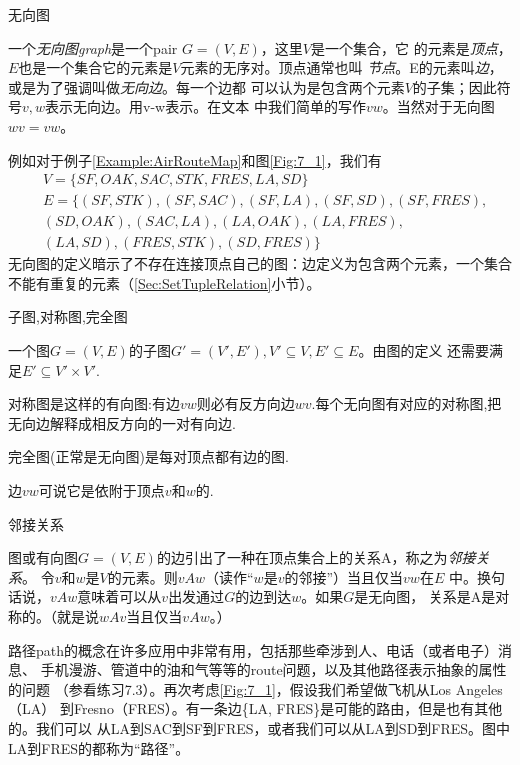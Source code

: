 \begin{definition}
无向图

一个\emph{无向图graph}是一个pair $G=(V,E)$，这里$V$是一个集合，它
的元素是\emph{顶点}，$E$也是一个集合它的元素是$V$元素的无序对。顶点通常也叫
\emph{节点}。E的元素叫\emph{边}，或是为了强调叫做\emph{无向边}。每一个边都
可以认为是包含两个元素$V$的子集；因此符号${v, w}$表示无向边。用v-w表示。在文本
中我们简单的写作$vw$。当然对于无向图$wv=vw$。
\end{definition}

例如对于例子\ref{Example:AirRouteMap}和图\ref{Fig:7_1}，我们有
\begin{displaymath}
\begin{aligned}
&V=\{SF,OAK, SAC, STK, FRES, LA, SD\}\\
&E=\{(SF,STK), (SF,SAC), (SF,LA),(SF,SD), (SF,FRES),\\
&(SD,OAK),(SAC,LA),(LA,OAK),(LA,FRES),\\
&(LA,SD),(FRES, STK), (SD, FRES)\}
\end{aligned}
\end{displaymath}
无向图的定义暗示了不存在连接顶点自己的图：边定义为包含两个元素，一个集合
不能有重复的元素（\ref{Sec:SetTupleRelation}小节）。

\begin{definition}
子图,对称图,完全图

一个图$G=(V,E)$的子图$G'=(V',E'),V'\subseteq V, E'\subseteq
E$。由图的定义 还需要满足$E' \subseteq  V'\times V'$.

对称图是这样的有向图:有边$vw$则必有反方向边$wv$.每个无向图有对应的对称图,把
无向边解释成相反方向的一对有向边.

完全图(正常是无向图)是每对顶点都有边的图.

边$vw$可说它是依附于顶点$v$和$w$的.
\end{definition}

\begin{definition}
邻接关系

图或有向图$G=(V,E)$的边引出了一种在顶点集合上的关系A，称之为\emph{邻接关系}。
令$v$和$w$是$V$的元素。则$vAw$（读作“$w$是$v$的邻接”）当且仅当$vw$在$E$
中。换句话说，$vAw$意味着可以从$v$出发通过$G$的边到达$w$。如果$G$是无向图，
关系是A是对称的。（就是说$wAv$当且仅当$vAw$。）
\end{definition}

路径path的概念在许多应用中非常有用，包括那些牵涉到人、电话（或者电子）消息、
手机漫游、管道中的油和气等等的route问题，以及其他路径表示抽象的属性的问题
（参看练习7.3）。再次考虑\ref{Fig:7_1}，假设我们希望做飞机从Los Angeles（LA）
到Fresno（FRES）。有一条边\{LA, FRES\}是可能的路由，但是也有其他的。我们可以
从LA到SAC到SF到FRES，或者我们可以从LA到SD到FRES。图中LA到FRES的都称为“路径”。

